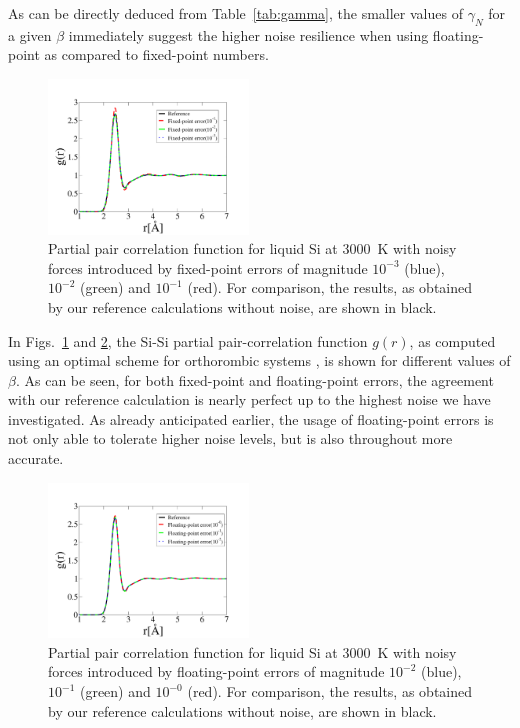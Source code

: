 As can be directly deduced from Table~\ref{tab:gamma}, the smaller values of $\gamma_N$ for a given $\beta$ immediately suggest the higher noise resilience when using floating-point as compared to fixed-point numbers.
\begin{figure}%
\begin{center} 
\includegraphics[width=0.475\textwidth]
{figures/Fixed_point_rdf2.pdf}
\end{center}
\caption{\label{Fig1}
Partial pair correlation function for liquid Si at 3000~K with noisy forces introduced by fixed-point errors of magnitude $10^{-3}$ (blue), $10^{-2}$ (green) and $10^{-1}$ (red). For comparison, the results, as obtained by our reference calculations without noise, are shown in black. 
} \end{figure}
In Figs.~\ref{Fig1} and \ref{Fig2}, the Si-Si partial pair-correlation function $g(r)$, as computed using an optimal scheme for orthorombic systems \cite{KAF}, is shown for different values of $\beta$. %
As can be seen, for both fixed-point and floating-point errors, the agreement with our reference calculation is nearly perfect up to the highest noise we have investigated. As already anticipated earlier, the usage of floating-point errors is not only able to tolerate higher noise levels, but is also throughout more accurate. 
\begin{figure}%
\begin{center}
\includegraphics[width=0.475\textwidth]
{figures/Floating_point_rdf2.pdf}
\end{center}
\caption{\label{Fig2}
Partial pair correlation function for liquid Si at 3000~K with noisy forces introduced by floating-point errors of magnitude $10^{-2}$ (blue), $10^{-1}$ (green) and $10^{-0}$ (red). For comparison, the results, as obtained by our reference calculations without noise, are shown in black. 
} \end{figure}

